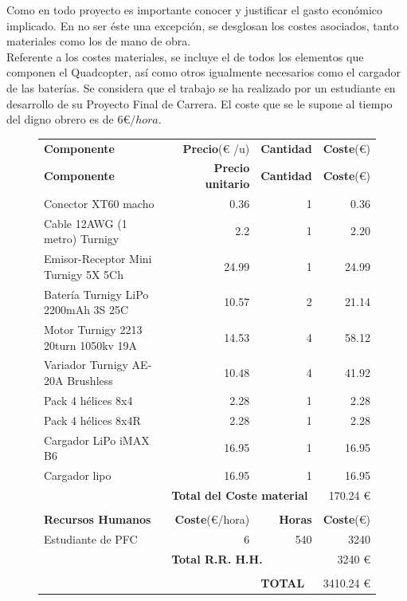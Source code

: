 \documentclass[twoside,11pt]{book}
\begin{document}
Como en todo proyecto es importante conocer y justificar el gasto económico implicado. En no ser éste una excepción, se desglosan los costes asociados, tanto materiales como los de mano de obra. \\
Referente a los costes materiales, se incluye el de todos los elementos que componen el Quadcopter, así como otros igualmente necesarios como el cargador de las baterías. Se considera que el trabajo se ha realizado por un estudiante en desarrollo de su Proyecto Final de Carrera. El coste que se le supone al tiempo del digno obrero es de $6$€$/ hora$. \\  
\begin{figure}[h!]
\hspace{-0.2cm}
\begin{tabular}{|l|r|r|r|}
\hline

\hspace{2cm}\textbf{Componente} & \textbf{Precio}(€ /u) & \textbf{Cantidad} & \textbf{Coste}(€) \\
\textbf{Componente} & \textbf{Precio unitario} & \textbf{Cantidad} & \textbf{Coste}(€) \\

\hline
\hline
Conector XT60 macho & 0.36 & 1 & 0.36 \\
Cable 12AWG (1 metro) Turnigy & 2.2 & 1 & 2.20 \\
Emisor-Receptor Mini Turnigy 5X 5Ch & 24.99 & 1 & 24.99 \\
Batería Turnigy LiPo 2200mAh 3S 25C & 10.57 & 2 & 21.14 \\
Motor Turnigy 2213 20turn 1050kv 19A & 14.53 & 4 & 58.12 \\
Variador Turnigy AE-20A Brushless & 10.48 & 4 & 41.92 \\
Pack 4 hélices 8x4 & 2.28 & 1 & 2.28 \\
Pack 4 hélices 8x4R & 2.28 & 1 & 2.28 \\ 

Cargador LiPo iMAX B6 & 16.95 & 1 & 16.95 \\
\hline \cmidrule{2-4}

Cargador lipo & 16.95 & 1 & 16.95 \\
\hline \cmidrule{3-4}

\multicolumn{1}{r}{} & \multicolumn{2}{|l|}{\textbf{Total del Coste material}} & 170.24 €\\ \cmidrule{2-4}
\multicolumn{4}{r}{} \\
\hline
\hspace{1.5cm}\textbf{Recursos Humanos} & \textbf{Coste}(€/hora) & \textbf{Horas} & \textbf{Coste}(€) \\
\hline
\hline
Estudiante de PFC & 6 & 540 & 3240 \\
\hline \cmidrule{2-4}
\multicolumn{1}{r}{} & \multicolumn{2}{|l|}{\textbf{Total R.R. H.H.}} & 3240 €\\ \cmidrule{2-4}
\multicolumn{4}{r}{} \\
\cmidrule{3-4}
\multicolumn{2}{r}{} & \multicolumn{1}{|l|}{\textbf{TOTAL}} & 3410.24 €\\ \cmidrule{3-4}
\end{tabular} 
\end{figure}
\newpage
\end{document}
